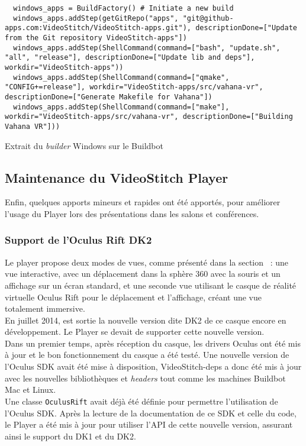 \begin{listing}
  \begin{verbatim}
  windows_apps = BuildFactory() # Initiate a new build
  windows_apps.addStep(getGitRepo("apps", "git@github-apps.com:VideoStitch/VideoStitch-apps.git"), descriptionDone=["Update from the Git repository VideoStitch-apps"])
  windows_apps.addStep(ShellCommand(command=["bash", "update.sh", "all", "release"], descriptionDone=["Update lib and deps"], workdir="VideoStitch-apps"))
  windows_apps.addStep(ShellCommand(command=["qmake", "CONFIG+=release"], workdir="VideoStitch-apps/src/vahana-vr", descriptionDone=["Generate Makefile for Vahana"])
  windows_apps.addStep(ShellCommand(command=["make"], workdir="VideoStitch-apps/src/vahana-vr", descriptionDone=["Building Vahana VR"]))
  \end{verbatim}
  \caption{Extrait du \textit{builder} Windows sur le Buildbot}
  \label{windows-apps}
\end{listing}

\subsection{Maintenance du VideoStitch Player}
Enfin, quelques apports mineurs et rapides ont été apportés, pour améliorer l'usage
du Player lors des présentations dans les salons et conférences.
\subsubsection{Support de l'Oculus Rift DK2}
Le player propose deux modes de vues, comme présenté dans la section ~:
une vue interactive, avec un déplacement dans la sphère 360 avec la souris et un affichage
sur un écran standard, et une seconde vue utilisant le casque de réalité virtuelle 
Oculus Rift pour le déplacement et l'affichage, créant une vue totalement immersive.\\
En juillet 2014\cite{dk2s-now-shipping}, est sortie la nouvelle version dite DK2 de ce casque encore
en développement. Le Player se devait de supporter cette nouvelle version.\\
Dans un premier temps, après réception du casque, les drivers Oculus ont été mis à
jour et le bon fonctionnement du casque a été testé. Une nouvelle version de l'Oculus
SDK avait été mise à disposition, VideoStitch-deps a donc été mis à jour avec les nouvelles
bibliothèques et \textit{headers} tout comme les machines Buildbot Mac et Linux.\\
\newline
Une classe \texttt{OculusRift} avait déjà été définie pour permettre l'utilisation
de l'Oculus SDK. Après la lecture de la documentation de ce SDK et celle du code,
le Player a été mis à jour pour utiliser l'API de cette nouvelle version, assurant
ainsi le support du DK1 et du DK2.

